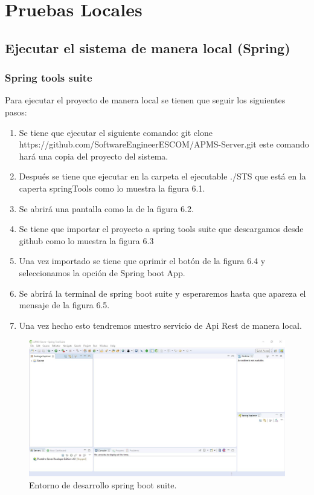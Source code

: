 \chapter{Pruebas Locales}

\section{Ejecutar el sistema de manera local (Spring)}

\subsection{Spring tools suite}
Para ejecutar el proyecto de manera local se tienen que seguir los siguientes pasos:
\begin{enumerate}
    \item Se tiene que ejecutar el siguiente comando: git clone https://github.com/SoftwareEngineerESCOM/APMS-Server.git este comando hará una copia del proyecto del sistema.
    \item Después se tiene que ejecutar en la carpeta el ejecutable ./STS que está en la caperta springTools como lo muestra la figura 6.1.
    \item Se abrirá una pantalla como la de la figura 6.2.
    \item Se tiene que importar el proyecto a spring tools suite que descargamos desde github como lo muestra la figura 6.3
    \item Una vez importado se tiene que oprimir el botón de la figura 6.4 y seleccionamos la opción de Spring boot App.
    \item Se abrirá la terminal de spring boot suite y esperaremos hasta que apareza el mensaje de la figura 6.5.
    \item Una vez hecho esto tendremos nuestro servicio de Api Rest de manera local.
\end{enumerate}


\begin{figure}[!h]
	\centering
	\includegraphics[width=0.7\linewidth]{images/tecnologias/spring.JPG}
	\caption{Entorno de desarrollo spring boot suite.}
\end{figure}


